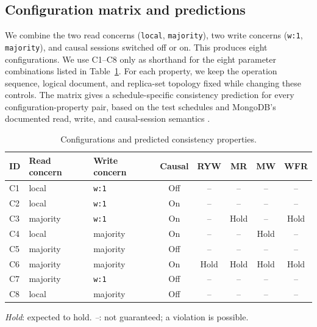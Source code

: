 \subsection{Configuration matrix and predictions}

We combine the two read concerns (\texttt{local}, \texttt{majority}), two write
concerns (\texttt{w:1}, \texttt{majority}), and causal sessions switched off or
on. This produces eight configurations. We use C1--C8 only as shorthand for
the eight parameter combinations listed in Table~\ref{tab:configurations}.
For each property, we keep the operation sequence, logical document, and
replica-set topology fixed while changing these controls. The matrix gives a
schedule-specific consistency prediction for every configuration-property
pair, based on the test schedules and MongoDB's documented read, write, and
causal-session semantics
\cite{mongodb-read-concern,mongodb-write-concern,mongodb-causal-consistency}.

\begin{table}[ht]
\centering
\small
\setlength{\tabcolsep}{5pt}
\renewcommand{\arraystretch}{1.15}
\caption{Configurations and predicted consistency properties.}
\label{tab:configurations}
\begin{tabular}{@{}lllccccc@{}}
\toprule
ID & Read concern & Write concern & Causal
   & RYW & MR & MW & WFR \\
\midrule
C1 & local    & \texttt{w:1} & Off
   & --   & --   & --   & --   \\
C2 & local    & \texttt{w:1} & On
   & --   & --   & --   & --   \\
C3 & majority & \texttt{w:1} & On
   & --   & Hold & --   & Hold \\
C4 & local    & majority    & On
   & --   & --   & Hold & --   \\
C5 & majority & majority    & Off
   & --   & --   & -- & -- \\
C6 & majority & majority    & On
   & Hold & Hold & Hold & Hold \\
C7 & majority & \texttt{w:1} & Off
   & --   & --   & --   & --   \\
C8 & local    & majority    & Off
   & --   & --   & -- & -- \\
\bottomrule
\end{tabular}

\smallskip
\begin{minipage}{\linewidth}
\footnotesize
\textit{Hold}: expected to hold.
\textit{--}: not guaranteed; a violation is possible.

\smallskip
\end{minipage}
\end{table}
\FloatBarrier

